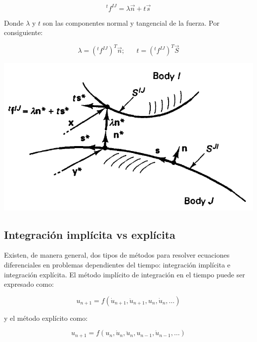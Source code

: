 \begin{equation}
^tf^{IJ} = \lambda \vec{n} + t \vec{s}
\end{equation}

Donde $\lambda$ y $t$ son las componentes normal y tangencial de la fuerza. Por consiguiente:

\begin{equation}
\lambda = \left( ^tf^{IJ} \right)^T \vec{n}; \,\,\,\,\,\,\,\,\,\, t = \left( ^tf^{IJ} \right)^T \vec{S}
\end{equation}

\begin{center}
\includegraphics[scale=0.65]{src/ch2/contact_analysis.png}
\label{fig:contact_analysis}
\end{center}


\subsection{Integración implícita vs explícita}

Existen, de manera general, dos tipos de métodos para resolver ecuaciones diferenciales  
en problemas dependientes del tiempo: integración implícita e integración explícita. El 
método implícito de integración en el tiempo puede ser expresado como: ~\cite{nielsen1997}

\begin{equation}
u_{n+1}=f(\dot{u}_{n+1},\ddot{u}_{n+1},u_n,\dot{u}_n,…)
\end{equation}

y el método explícito como:

\begin{equation}
u_{n+1}=f(u_n,\dot{u}_n,\ddot{u}_n,u_{n-1},\dot{u}_{n-1},…)
\end{equation}

